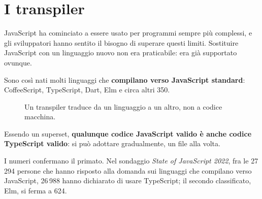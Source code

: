 \section{I transpiler}

JavaScript ha cominciato a essere usato per programmi sempre più complessi, e
gli sviluppatori hanno sentito il bisogno di superare questi limiti. Sostituire
JavaScript con un linguaggio nuovo non era praticabile: era già supportato
ovunque.

Sono così nati molti linguaggi che \textbf{compilano verso JavaScript
standard}: CoffeeScript, TypeScript, Dart, Elm e circa altri 350.

\begin{figure}[H]
  \centering
  \caption{Un transpiler traduce da un linguaggio a un altro, non a codice
           macchina.}
  \label{fig:transpiler}
\end{figure}


Essendo un superset, \textbf{qualunque codice JavaScript valido è anche codice
TypeScript valido}: si può adottare gradualmente, un file alla volta.

I numeri confermano il primato. Nel sondaggio \textit{State of JavaScript 2022},
fra le 27\,294 persone che hanno risposto alla domanda sui linguaggi che
compilano verso JavaScript, 26\,988 hanno dichiarato di usare TypeScript; il
secondo classificato, Elm, si ferma a 624.


